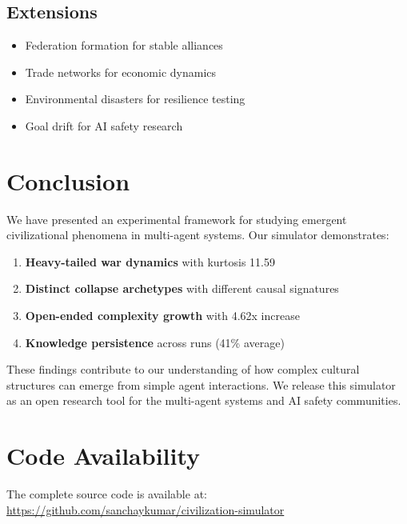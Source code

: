 \documentclass[11pt,a4paper]{article}
\begin{document}
\subsection{Extensions}

\begin{itemize}
    \item Federation formation for stable alliances
    \item Trade networks for economic dynamics
    \item Environmental disasters for resilience testing
    \item Goal drift for AI safety research
\end{itemize}

\section{Conclusion}

We have presented an experimental framework for studying emergent civilizational phenomena in multi-agent systems. Our simulator demonstrates:

\begin{enumerate}
    \item \textbf{Heavy-tailed war dynamics} with kurtosis 11.59
    \item \textbf{Distinct collapse archetypes} with different causal signatures
    \item \textbf{Open-ended complexity growth} with 4.62x increase
    \item \textbf{Knowledge persistence} across runs (41\% average)
\end{enumerate}

These findings contribute to our understanding of how complex cultural structures can emerge from simple agent interactions. We release this simulator as an open research tool for the multi-agent systems and AI safety communities.

\section*{Code Availability}

The complete source code is available at:\\
\url{https://github.com/sanchaykumar/civilization-simulator}
\end{document}
